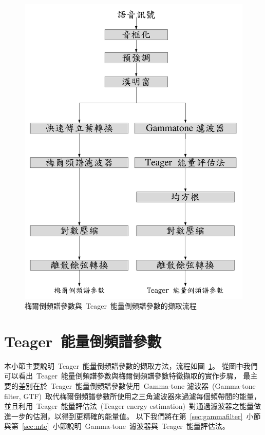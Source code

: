 \begin{figure}[!htb]
\centering
\includegraphics[width=1.0\textwidth]{figs/flow}
\caption{梅爾倒頻譜參數與~Teager~能量倒頻譜參數的擷取流程} 
\label{fig:flow_tecc_mfcc}
\end{figure}


\section{Teager~能量倒頻譜參數}
\label{sec:teccfe}
本小節主要說明~Teager~能量倒頻譜參數的擷取方法，流程如圖~\ref{fig:flow_tecc_mfcc}。
從圖中我們可以看出~Teager~能量倒頻譜參數與梅爾倒頻譜參數特徵擷取的實作步驟，
最主要的差別在於~Teager~能量倒頻譜參數使用~Gamma-tone 濾波器~(Gamma-tone filter, GTF)~取代梅爾倒頻譜參數所使用之三角濾波器來過濾每個頻帶間的能量，
並且利用~Teager~能量評估法~(Teager energy estimation)~對通過濾波器之能量做進一步的估測，以得到更精確的能量值。
以下我們將在第~\ref{sec:gammafilter}~小節與第~\ref{sec:mte}~小節說明~Gamma-tone~濾波器與~Teager~能量評估法。
